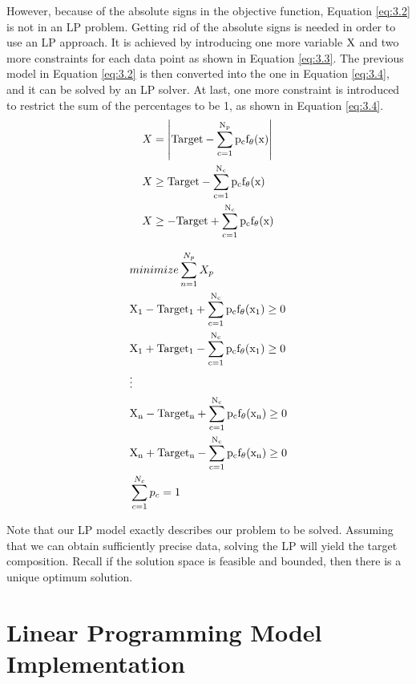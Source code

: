 However, because of the absolute signs in the objective function, Equation \ref{eq:3.2} is not in an LP problem. Getting rid of the absolute signs is needed in order to use an LP approach. It is achieved by introducing one more variable $\rm X$ and two more constraints for each data point as shown in Equation \ref{eq:3.3}. The previous model in Equation \ref{eq:3.2} is then converted into the one in Equation \ref{eq:3.4}, and it can be solved by an LP solver. At last, one more constraint is introduced to restrict the sum of the percentages to be 1, as shown in Equation \ref{eq:3.4}. \\

\begin{eqnarray} \label{eq:3.3}
& X = \left| \rm Target-\displaystyle\sum^{N_{p}}_{c=1}p_{c}f_{\theta}(x) \right| \nonumber \\
&  X \geq \rm Target-\displaystyle\sum^{N_{c}}_{c=1}p_{c}f_{\theta}(x)   \nonumber \\
& X \geq -\rm Target+\displaystyle\sum^{N_{c}}_{c=1}p_{c}f_{\theta}(x)  
\end{eqnarray} 

\begin{eqnarray} \label{eq:3.4}
& minimize \displaystyle\sum^{N_{p}}_{n=1} X_p \nonumber \\
& \rm X_1 - \rm Target_1 + \displaystyle\sum^{N_{c}}_{c=1}p_{c}f_{\theta}(x_1) \geq 0 \nonumber \\
& \rm X_1 + \rm Target_1 - \displaystyle\sum^{N_{c}}_{c=1}p_{c}f_{\theta}(x_1) \geq 0 \nonumber \\
&\vdots  \nonumber \\
& \rm X_n - \rm Target_n + \displaystyle\sum^{N_{c}}_{c=1}p_{c}f_{\theta}(x_n) \geq 0 \nonumber \\
& \rm X_n + \rm Target_n - \displaystyle\sum^{N_{c}}_{c=1}p_{c}f_{\theta}(x_n) \geq 0 \nonumber \\
& \displaystyle\sum^{N_{c}}_{c=1}p_{c} = 1 
\end{eqnarray} 

Note that our LP model exactly describes our problem to be solved. Assuming that we can obtain sufficiently precise data, solving the LP will yield the target composition. Recall if the solution space is feasible and bounded, then there is a unique optimum solution. \\

\section{Linear Programming Model Implementation}

